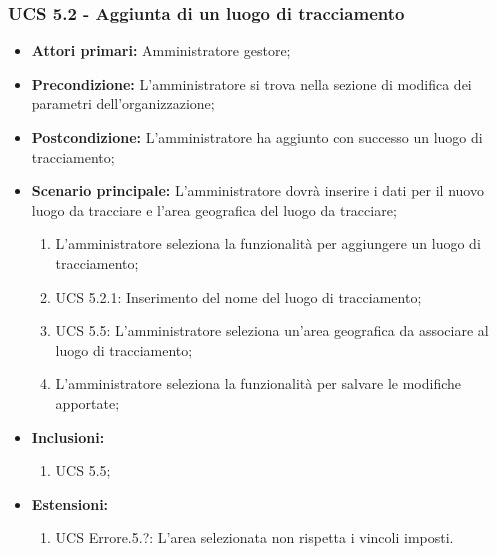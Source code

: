 \subsubsection{UCS 5.2 - Aggiunta di un luogo di tracciamento}%
\begin{itemize}
    \item \textbf{Attori primari:} Amministratore gestore;
    \item \textbf{Precondizione:} L'amministratore si trova nella sezione di modifica dei parametri dell'organizzazione;
    \item \textbf{Postcondizione:} L'amministratore ha aggiunto con successo un luogo di tracciamento;
    \item \textbf{Scenario principale:} L'amministratore dovrà inserire i dati per il nuovo luogo da tracciare e l'area geografica del luogo da tracciare;
    \begin{enumerate}%
        \item L'amministratore seleziona la funzionalità per aggiungere un luogo di tracciamento;
        \item UCS 5.2.1: Inserimento del nome del luogo di tracciamento;
        \item UCS 5.5: L'amministratore seleziona un'area geografica da associare al luogo di tracciamento;
        \item L'amministratore seleziona la funzionalità per salvare le modifiche apportate;
    \end{enumerate} 
    \item \textbf{Inclusioni:}
    \begin{enumerate}
        \item UCS 5.5;
    \end{enumerate}
    \item \textbf{Estensioni:}
    \begin{enumerate}
        \item UCS Errore.5.?: L'area selezionata non rispetta i vincoli imposti.
    \end{enumerate}
\end{itemize}

